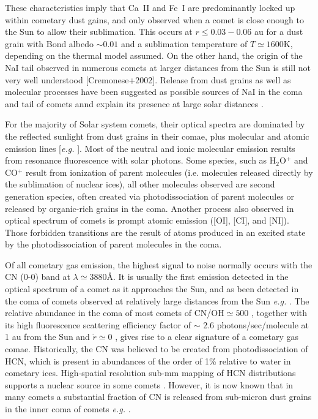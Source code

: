 \documentclass{aa}
\begin{document}
These characteristics imply that Ca~II and Fe~I are predominantly locked up within cometary dust gains, and only observed when a comet is close enough to the Sun to allow their sublimation. This occurs at $r\leq 0.03-0.06$ au for a dust grain with Bond albedo $\sim0.01$ and a sublimation temperature of $T\simeq 1600$K, depending on the thermal model assumed. On the other hand, the origin of the NaI tail observed in numerous comets at larger distances from the Sun is still not very well understood [Cremonese+2002]. Release from dust grains as well as molecular processes have been suggested as possible sources of NaI in the coma and tail of comets annd explain its presence at large solar distances \citep{Cremonese1997}.

For the majority of Solar system comets, their optical spectra are dominated by the reflected sunlight from dust grains in their comae, plus molecular and atomic emission lines [{\it e.g.} \citep{hyland2019}]. Most of the neutral and ionic molecular emission results from resonance fluorescence with solar photons. Some species, such as H$_2$O$^+$ and  CO$^+$ result from ionization of parent molecules (i.e. molecules released directly by the sublimation of nuclear ices), all other molecules observed are second generation species, often created via photodissociation of parent molecules or released by organic-rich grains in the coma. Another process also observed in optical spectrum of comets is prompt atomic emission  ([OI], [CI], and [NI]). Those forbidden transitions are the result of atoms produced in an excited state by the photodissociation of parent molecules in the coma. 


Of all cometary gas emission, the highest signal to noise normally occurs with the CN (0-0) band at $\lambda\simeq 3880$\AA. It is usually the first emission detected in the optical spectrum of a comet as it approaches the Sun, and as been detected in the coma of comets observed at relatively large distances from the Sun {\it e.g.}  \cite{Fitzsimmons1996}. The relative abundance in the coma of most comets of CN/OH$\simeq500$ \citep{AHearn1995}, together with its high fluorescence scattering efficiency factor of $\sim$ 2.6 photons/sec/molecule at 1 au from the Sun and $\dot{r}\simeq 0$ \citep{Schleicher2010}, gives rise to a clear signature of a cometary gas comae. Historically, the CN was believed to be created from photodissociation of HCN, which is present in abundances of the order of 1\% relative to water in cometary ices.  High-spatial resolution sub-mm mapping of HCN distributions supports a nuclear source in some comets \citep{Cordiner2014}. However, it is now known that in many comets a substantial fraction of CN is released from sub-micron dust grains in the inner coma of comets {\it e.g.} \cite{Fray2005}. 
\end{document}
